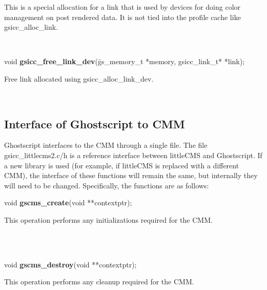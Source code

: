 \documentclass[12pt,notitlepage]{article}
\begin{document}
\begin{minipage}[h]{6.0in}
    This is a special allocation for a link that is used by devices for
    doing color management on post rendered data.  It is not tied into the
    profile cache like gsicc\_alloc\_link.
\end{minipage}\\

\begin{tabbing}
\noindent void {\bf gsicc\_free\_link\_dev}(\=gs\_memory\_t *memory, gsicc\_link\_t* *link);\\
\end{tabbing}

\begin{minipage}[h]{6.0in}
    Free link allocated using gsicc\_alloc\_link\_dev.
\end{minipage}\\

\singlespace

\subsection{Interface of Ghostscript to CMM}

Ghostscript interfaces to the CMM through a single file.  The file gsicc\_littlecms2.c/h is a reference interface between littleCMS and Ghostscript.  If a new library is used (for example, if littleCMS is replaced with a different CMM), the interface of these functions will remain the same, but internally they will need to be changed.  Specifically, the functions are as follows:\\

\singlespace

\begin{tabbing}
\noindent void {\bf gscms\_create}(void **contextptr);\\
\end{tabbing}

\begin{minipage}[h]{6.0in}
	This operation performs any initializations required for the CMM.
\end{minipage}\\
\\

\begin{tabbing}
\noindent void {\bf gscms\_destroy}(void **contextptr);\\
\end{tabbing}

\begin{minipage}[h]{6.0in}
	This operation performs any cleanup required for the CMM.
\end{minipage}\\
\\
\end{document}
